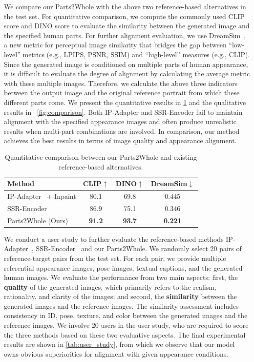 We compare our Parts2Whole with the above two reference-based alternatives in the test set. For quantitative comparison, we compute the commonly used CLIP score and DINO score to evaluate the similarity between the generated image and the specified human parts. For further alignment evaluation, we use DreamSim~\cite{fu2023dreamsim}, a new metric for perceptual image similarity that bridges the gap between ``low-level'' metrics (e.g., LPIPS, PSNR, SSIM) and ``high-level'' measures (e.g., CLIP). Since the generated image is conditioned on multiple parts of human appearance, it is difficult to evaluate the degree of alignment by calculating the average metric with these multiple images. Therefore, we calculate the above three indicators between the output image and the original reference portrait from which these different parts come. We present the quantitative results in \cref{tab:quan_comp} and the qualitative results in ~\cref{fig:comparison}. Both IP-Adapter and SSR-Encoder fail to maintain alignment with the specified appearance images and often produce unrealistic results when multi-part combinations are involved. In comparison, our method achieves the best results in terms of image quality and appearance alignment.

\begin{table}\small
  \centering
  \caption{Quantitative comparison between our Parts2Whole and existing reference-based alternatives.}
  \begin{tabular}{@{}lccc@{}}
    \toprule
    Method & CLIP$\uparrow$ & DINO$\uparrow$ & DreamSim\cite{fu2023dreamsim}$\downarrow$ \\
    \midrule
    IP-Adapter~\cite{ye2023ipadapter} + Inpaint & 80.1 & 69.8 & 0.445   \\
    SSR-Encoder~\cite{zhang2024ssrencoder} & 86.9 & 75.1 & 0.346 \\
   Parts2Whole (Ours) & \textbf{91.2} & \textbf{93.7} & \textbf{0.221}  \\
    \bottomrule
  \end{tabular}
  \label{tab:quan_comp}
\end{table}

We conduct a user study to further evaluate the reference-based methods IP-Adapter~\cite{ye2023ipadapter}, SSR-Encoder~\cite{zhang2024ssrencoder} and our Parts2Whole. We randomly select 20 pairs of reference-target pairs from the test set. For each pair, we provide multiple referential appearance images, pose images, textual captions, and the generated human images. We evaluate the performance from two main aspects: first, the \textbf{quality} of the generated images, which primarily refers to the realism, rationality, and clarity of the images; and second, the \textbf{similarity} between the generated images and the reference images. The similarity assessment includes consistency in ID, pose, texture, and color between the generated images and the reference images. We involve 20 users in the user study, who are required to score the three methods based on these two evaluative aspects. The final experimental results are shown in \cref{tab:user_study}, from which we observe that our model owns obvious superiorities for alignment with given appearance conditions.

